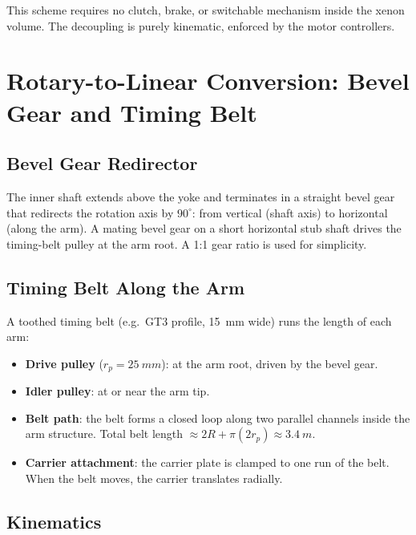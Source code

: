 \documentclass[11pt,a4paper]{article}
\begin{document}
This scheme requires no clutch, brake, or switchable mechanism inside
the xenon volume. The decoupling is purely kinematic, enforced by the
motor controllers.


\section{Rotary-to-Linear Conversion: Bevel Gear and Timing Belt}
\label{sec:belt}

\subsection{Bevel Gear Redirector}

The inner shaft extends above the yoke and terminates in a straight
bevel gear that redirects the rotation axis by $90^\circ$: from vertical
(shaft axis) to horizontal (along the arm). A mating bevel gear on a
short horizontal stub shaft drives the timing-belt pulley at the arm
root. A 1:1 gear ratio is used for simplicity.

\subsection{Timing Belt Along the Arm}

A toothed timing belt (e.g.\ GT3 profile, \SI{15}{mm} wide) runs the
length of each arm:
\begin{itemize}[nosep]
  \item \textbf{Drive pulley} ($r_p = \SI{25}{mm}$): at the arm root,
        driven by the bevel gear.
  \item \textbf{Idler pulley}: at or near the arm tip.
  \item \textbf{Belt path}: the belt forms a closed loop along two
        parallel channels inside the arm structure. Total belt length
        $\approx 2R + \pi(2 r_p) \approx \SI{3.4}{m}$.
  \item \textbf{Carrier attachment}: the carrier plate is clamped to
        one run of the belt. When the belt moves, the carrier translates
        radially.
\end{itemize}

\subsection{Kinematics}
\end{document}
